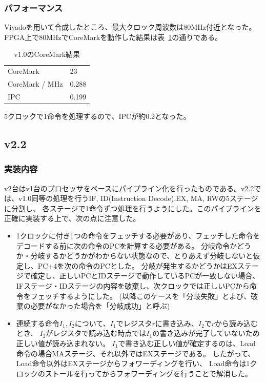 \documentclass[dvipdfmx,10pt,a4paper,titlepage]{jsarticle}
\begin{document}
    \subsubsection{パフォーマンス}
    Vivadoを用いて合成したところ、最大クロック周波数は$80\mathrm{MHz}$付近となった。
    FPGA上で$80\mathrm{MHz}$でCoreMarkを動作した結果は表~\ref{tab:v1.0}の通りである。
    \begin{table}[h]
        \begin{center}
            \caption{v1.0のCoreMark結果}\label{tab:v1.0}
            \begin{tabular}{ll}
                CoreMark & 23 \\
                CoreMark / MHz & 0.288 \\
                IPC & 0.199 \\
            \end{tabular}
        \end{center}
    \end{table}
    5クロックで1命令を処理するので、IPCが約0.2となった。
    \subsection{v2.2}
    \subsubsection{実装内容}
    v2台はv1台のプロセッサをベースにパイプライン化を行ったものである。v2.2では、v1.0同等の処理を行うIF, ID(Instruction Decode),EX, MA, RWの5ステージに分割し、
    各ステージで1命令ずつ処理を行うようにした。このパイプラインを正確に実装する上で、次の点に注意した。
    \begin{itemize}
        \item 1クロックに付き1つの命令をフェッチする必要があり、フェッチした命令をデコードする前に次の命令のPCを計算する必要がある。
        分岐命令かどうか・分岐するかどうかがわからない状態なので、とりあえず分岐しないと仮定し、PC+4を次の命令のPCとした。
        分岐が発生するかどうかはEXステージで確定し、正しいPCとIDステージで動作しているPCが一致しない場合、IFステージ・IDステージの内容を破棄し、次クロックでは正しいPCから命令をフェッチするようにした。
        (以降このケースを「分岐失敗」とよび、破棄の必要がなかった場合を「分岐成功」と呼ぶ)
        \item 連続する命令$I_1, I_2$について、$I_1$でレジスタ$r$に書き込み、$I_2$で$r$から読み込むとき、
        $I_2$がレジスタで読み込む時点では$I_1$の書き込みが完了していないため正しい値が読み込まれない。
        $I_1$で書き込む正しい値が確定するのは、Load命令の場合MAステージ、それ以外ではEXステージである。
        したがって、Load命令以外はEXステージからフォワーディングを行い、
        Load命令は1クロックのストールを行ってからフォワーディングを行うことで解消した。
    \end{itemize}
    
\end{document}
